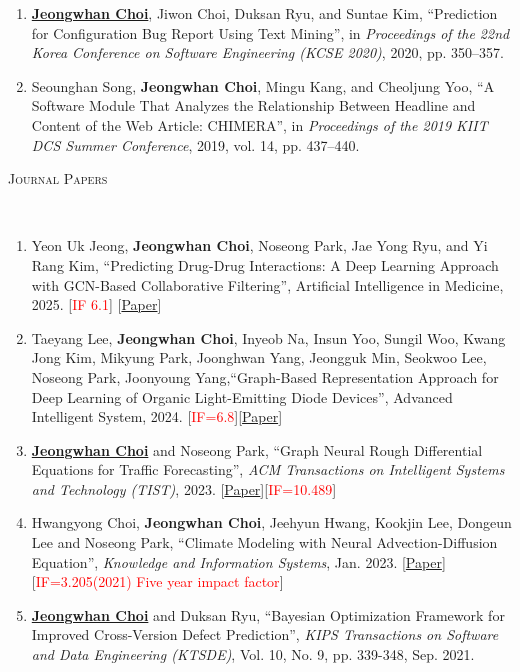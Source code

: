 \documentclass[10pt]{article}
\newenvironment{changemargin}[2]{
  \begin{list}{}{
    \setlength{\topsep}{0pt}
    \setlength{\leftmargin}{#1}
    \setlength{\rightmargin}{#2}
    \setlength{\listparindent}{\parindent}
    \setlength{\itemindent}{\parindent}
    \setlength{\parsep}{\parskip}
  }
  \item[]}{\end{list}
}
\newcommand{\lineover}{
	\begin{changemargin}{-0.05in}{-0.05in}
		\vspace*{-8pt}
		\hrulefill \\
		\vspace*{-2pt}
	\end{changemargin}
}
\newcommand{\RED}[1]{\textcolor{red}{#1}}
\newcommand{\textbu}[1]{\underline{\textbf{#1}}}
\newenvironment{body} {
	\vspace*{-16pt}
	\begin{changemargin}{-0.25in}{-0.5in}
  }
	{\end{changemargin}
}
\begin{document}
\begin{body}
\begin{enumerate}
    \item \textbu{Jeongwhan Choi}, Jiwon Choi, Duksan Ryu, and Suntae Kim, ``Prediction for Configuration Bug Report Using Text Mining'', in \emph{Proceedings of the 22nd Korea Conference on Software Engineering (KCSE 2020)}, 2020, pp. 350–357.
    \item Seounghan Song, \textbf{Jeongwhan Choi}, Mingu Kang, and Cheoljung Yoo, ``A Software Module That Analyzes the Relationship Between Headline and Content of the Web Article: CHIMERA'', in \emph{Proceedings of the 2019 KIIT DCS Summer Conference}, 2019, vol. 14, pp. 437–440.
\end{enumerate}


\vspace{1em}
\textsc{Journal Papers}
\lineover
\begin{enumerate}
    \item Yeon Uk Jeong, \textbf{Jeongwhan Choi}, Noseong Park, Jae Yong Ryu, and Yi Rang Kim, ``Predicting Drug-Drug Interactions: A Deep Learning Approach with GCN-Based Collaborative Filtering'', Artificial Intelligence in Medicine, 2025. [\RED{IF 6.1}] [\href{https://doi.org/10.1016/j.artmed.2025.103185}{Paper}]
    \item Taeyang Lee, \textbf{Jeongwhan Choi}, Inyeob Na, Insun Yoo, Sungil Woo, Kwang Jong Kim, Mikyung Park, Joonghwan Yang, Jeongguk Min, Seokwoo Lee, Noseong Park, Joonyoung Yang,``Graph-Based Representation Approach for Deep Learning of Organic Light-Emitting Diode Devices'', Advanced Intelligent System, 2024. [\RED{IF=6.8}][\href{https://onlinelibrary.wiley.com/doi/10.1002/aisy.202400598}{Paper}]
    \item \textbu{Jeongwhan Choi} and Noseong Park, ``Graph Neural Rough Differential Equations for Traffic Forecasting'', \emph{ACM Transactions on Intelligent Systems and Technology (TIST)}, 2023. [\href{https://dl.acm.org/doi/abs/10.1145/3604808}{Paper}][\RED{IF=10.489}]
    \item Hwangyong Choi, \textbf{Jeongwhan Choi}, Jeehyun Hwang, Kookjin Lee, Dongeun Lee and Noseong Park, ``Climate Modeling with Neural Advection-Diffusion Equation'', \emph{Knowledge and Information Systems}, Jan. 2023. [\href{https://doi.org/10.1007/s10115-023-01829-2}{Paper}] [\RED{IF=3.205(2021) Five year impact factor}]
    \item \textbu{Jeongwhan Choi} and Duksan Ryu, ``Bayesian Optimization Framework for Improved Cross-Version Defect Prediction'', \emph{KIPS Transactions on Software and Data Engineering (KTSDE)}, Vol. 10, No. 9, pp. 339-348, Sep. 2021.

\end{enumerate}
\end{body}
\end{document}
